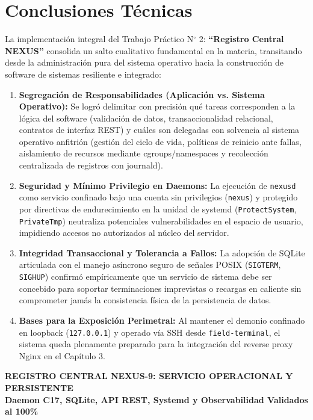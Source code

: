 \documentclass[10pt,a4paper]{article}
\begin{document}
\section{Conclusiones Técnicas}

La implementación integral del Trabajo Práctico N$^\circ$ 2: \textbf{“Registro Central NEXUS”} consolida un salto cualitativo fundamental en la materia, transitando desde la administración pura del sistema operativo hacia la construcción de software de sistemas resiliente e integrado:

\begin{enumerate}[leftmargin=*, itemsep=0.5pt, topsep=1pt]
    \item \textbf{Segregación de Responsabilidades (Aplicación vs. Sistema Operativo):} Se logró delimitar con precisión qué tareas corresponden a la lógica del software (validación de datos, transaccionalidad relacional, contratos de interfaz REST) y cuáles son delegadas con solvencia al sistema operativo anfitrión (gestión del ciclo de vida, políticas de reinicio ante fallas, aislamiento de recursos mediante cgroups/namespaces y recolección centralizada de registros con journald).
    \item \textbf{Seguridad y Mínimo Privilegio en Daemons:} La ejecución de \texttt{nexusd} como servicio confinado bajo una cuenta sin privilegios (\texttt{nexus}) y protegido por directivas de endurecimiento en la unidad de systemd (\texttt{ProtectSystem}, \texttt{PrivateTmp}) neutraliza potenciales vulnerabilidades en el espacio de usuario, impidiendo accesos no autorizados al núcleo del servidor.
    \item \textbf{Integridad Transaccional y Tolerancia a Fallos:} La adopción de SQLite articulada con el manejo asíncrono seguro de señales POSIX (\texttt{SIGTERM}, \texttt{SIGHUP}) confirmó empíricamente que un servicio de sistema debe ser concebido para soportar terminaciones imprevistas o recargas en caliente sin comprometer jamás la consistencia física de la persistencia de datos.
    \item \textbf{Bases para la Exposición Perimetral:} Al mantener el demonio confinado en loopback (\texttt{127.0.0.1}) y operado vía SSH desde \texttt{field-terminal}, el sistema queda plenamente preparado para la integración del reverse proxy Nginx en el Capítulo 3.
\end{enumerate}

\vspace{0.1cm}
\begin{center}
\begin{tcolorbox}[colback=uncblue!10,colframe=uncblue,width=0.88\textwidth,arc=2mm,center,boxsep=1.5mm]
    \centering\bfseries\small\color{uncblue}
    REGISTRO CENTRAL NEXUS-9: SERVICIO OPERACIONAL Y PERSISTENTE\\
    \footnotesize Daemon C17, SQLite, API REST, Systemd y Observabilidad Validados al 100\%
\end{tcolorbox}
\end{center}
\end{document}
